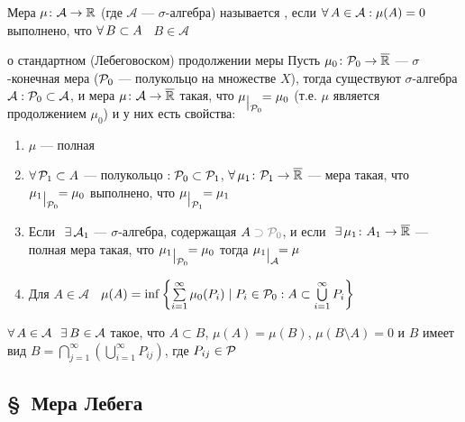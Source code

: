 \begin{opr}\label{полная мера}
	Мера $\mu \colon \mathcal{A} \to \mathbb R$ (где $\mathcal{A}$ --- $\sigma$-алгебра) называется , если $\forall \, A \in \mathcal{A} : \mu(A) = 0$ выполнено, что $\forall \, B \subset A$ \ $B \in \mathcal{A}$ 
\end{opr}
\pagebreak
\begin{teor}[https://www.youtube.com/live/Ptfcl76lZBs?si=5tjUKh1UlMak8EGx&t=10579]{о стандартном (Лебеговоском) продолжении меры}\label{прод.меры}%
	Пусть $\mu_0 \colon \mathcal{P}_0 \to \overline {\mathbb R}$ --- $\sigma$-конечная мера ($\mathcal{P}_0$ --- полукольцо на множестве $X$), тогда существуют $\sigma$-алгебра $\mathcal A : \mathcal{P}_0 \subset \mathcal A$, и мера $\mu \colon \mathcal A \to \overline {\mathbb R}$ такая, что $\mu \raisebox{0pt}[0pt][0pt]{\su{\p_0}} = \mu_0$ (т.е. $\mu$ является продолжением $\mu_0$) и у них есть свойства:
	\begin{enumerate}
		\item $\mu$ --- полная
		
		\item $\forall \, \mathcal{P}_1 \subset A$ --- полукольцо${}: \mathcal{P}_0 \subset \mathcal{P}_1$, $\forall \, \mu_1 \colon \mathcal{P}_1 \to \overline{\mathbb R}$ --- мера такая, что $\mu_1 \su{\p_0} = \mu_0$ выполнено, что $\mu\su{\p_1} = \mu_1$ 
		
		\item Если$\E \mathcal A_1$ --- $\sigma$-алгебра, содержащая $A\uns{{}\supset \p_0}$, и если$\E \mu_1 \colon A_1 \to \overline \rr$ --- полная мера такая, что $\mu_1\su{\p_0} = \mu_0$ тогда $\mu_1\su{\mathcal A} = \mu$
		
		\item\label{форм.меры} Для $A \in \mathcal{A}$ \ $\mu(A) = \inf\left\{\sum\limits_{i = 1}^\infty \mu_0 (P_i) \mid P_i \in \mathcal{P}_0 : A \subset \bigcup\limits_{i = 1}^\infty P_i \right\} $
	\end{enumerate}
\end{teor}

\begin{zam}[https://www.youtube.com/live/Ptfcl76lZBs?si=0IEfoZ4GCXaVGxNG&t=11380]
	$\A A \in \mathcal A \E B \in \mathcal{A}$ такое, что $A \subset B$, $\mu(A) = \mu(B)$, $\mu(B \setminus A) = 0$ и $B$ имеет вид $B = \bigcap\limits_{j = 1}^\infty \left( \bigcup\limits_{i = 1}^\infty P_{ij}\right)$, где $P_{ij} \in \mathcal{P}$
\end{zam}

\subsection*{\S\ Мера Лебега}

